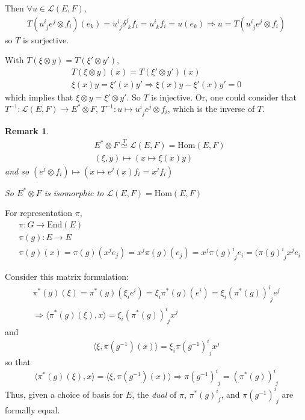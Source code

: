 \documentclass[10pt]{amsart}
\newtheorem{remark}{Remark}
\begin{document}
\begin{multicols*}{2}
\begin{enumerate}
Then $\forall u \in \mathcal{L}(E,F)$,
\[
\begin{gathered}
  T(u^i_{\,\, j} e^j \otimes f_i)(e_k) = u^i_{\,\,j}\delta^j_{\,\,k}f_i = u^i_{\,\,k}f_i = u(e_k) \Longrightarrow u = T(u^i_{\,\,j}e^j\otimes f_i)
\end{gathered}
\]
so $T$ is surjective.  

With $T(\xi\otimes y) = T(\xi'\otimes y')$, 
\[
\begin{gathered}
  T(\xi\otimes y)(x) = T(\xi' \otimes y')(x) \\
  \xi(x)y = \xi'(x)y' \Longrightarrow \xi(x)y - \xi'(x)y' = 0 
\end{gathered}
\]
which implies that $\xi\otimes y = \xi'\otimes y'$.  So $T$ is injective.  Or, one could consider that $T^{-1} : \mathcal{L}(E,F) \to E^*\otimes F$, $T^{-1} : u \mapsto u^i_{\,\,j}e^j\otimes f_i$, which is the inverse of $T$.  

\begin{remark}
\[
\begin{aligned}
  & E^* \otimes F \overset{T}{\simeq} \mathcal{L}(E,F) = \text{Hom}(E,F) \\ 
  & (\xi, y) \mapsto (x \mapsto \xi(x)y) 
\end{aligned}
\]
and so $(e^j \otimes f_i) \mapsto (x\mapsto e^j(x)f_i = x^jf_i)$

So $E^*\otimes F$ is isomorphic to $\mathcal{L}(E,F) = \text{Hom}(E,F)$
\end{remark}

For representation $\pi$, 
\[
\begin{aligned}
  & \pi:G \to \text{End}(E) \\ 
  & \pi(g):E \to E \\ 
  &  \pi(g)(x) = \pi(g)(x^j e_j) = x^j \pi(g)(e_j) = x^j \pi(g)^i_{ \,\, j} e_i = (\pi(g)^i_{\,\,j} x^j e_i
\end{aligned}
\]

Consider this matrix formulation:
\[
\begin{gathered}
  \pi^*(g)(\xi) = \pi^*(g)(\xi_i e^i) = \xi_i \pi^*(g)(e^i) = \xi_i (\pi^*(g))^i_{\,\,j}e^j \\
  \Longrightarrow \langle \pi^*(g)(\xi), x \rangle = \xi_i (\pi^*(g))^i_{ \,\, j}x^j
\end{gathered}
\]
and 
\[
\langle \xi, \pi(g^{-1})(x) \rangle = \xi_i \pi(g^{-1})^i_{ \,\, j}x^j 
\]
so that 
\[
\langle \pi^*(g)(\xi),x \rangle = \langle \xi, \pi(g^{-1})(x) \rangle \Longrightarrow \pi(g^{-1})^i_{\,\, j} = (\pi^*(g))^i_{ \,\, j}
\]
Thus, given a choice of basis for $E$, the \emph{dual} of $\pi$, $\pi^*(g)^i_{\,\,j}$, and $\pi(g^{-1})^i_{\,\,j}$ are formally equal.  


\end{enumerate}
\end{multicols*}
\end{document}
